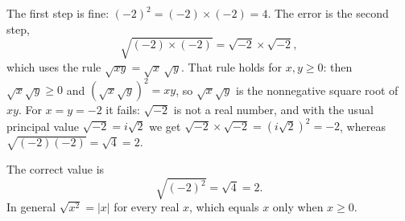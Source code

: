 The first step is fine: $(-2)^2=(-2)\times(-2)=4$. The error is the second step,
\[\sqrt{(-2)\times(-2)}=\sqrt{-2}\times\sqrt{-2},\]
which uses the rule $\sqrt{xy}=\sqrt x\,\sqrt y$. That rule holds for $x,y\ge0$: then $\sqrt x\sqrt y\ge0$ and $\left(\sqrt x\sqrt y\right)^2=xy$, so $\sqrt x\sqrt y$ is the nonnegative square root of $xy$. For $x=y=-2$ it fails: $\sqrt{-2}$ is not a real number, and with the usual principal value $\sqrt{-2}=i\sqrt2$ we get $\sqrt{-2}\times\sqrt{-2}=\left(i\sqrt2\right)^2=-2$, whereas $\sqrt{(-2)(-2)}=\sqrt4=2$.

The correct value is
\[\sqrt{(-2)^2}=\sqrt4=\boxed{2}.\]
In general $\sqrt{x^2}=|x|$ for every real $x$, which equals $x$ only when $x\ge0$.
